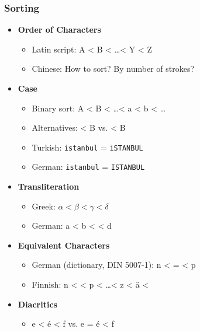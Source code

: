             \subsubsection{Sorting} %
                \begin{itemize}
                	\item \textbf{Order of Characters}
                		\begin{itemize}
                			\item Latin script: A < B < \dots < Y < Z
                			\item Chinese: How to sort? By number of strokes?
                		\end{itemize}
                	\item \textbf{Case}
                		\begin{itemize}
                			\item Binary sort: A < B < \dots < a < b < \dots
                			\item Alternatives:  < B vs.  < B
                			\item Turkish: \texttt{istanbul} = \texttt{iSTANBUL}
                			\item German: \texttt{istanbul} = \texttt{ISTANBUL}
                		\end{itemize}
                	\item \textbf{Transliteration}
                		\begin{itemize}
                			\item Greek: \( \alpha < \beta < \gamma < \delta \)
                			\item German: a < b <  < d
                		\end{itemize}
                	\item \textbf{Equivalent Characters}
                		\begin{itemize}
                			\item German (dictionary, DIN 5007-1): n <  =  < p
                			\item Finnish: n <  < p < \dots < z < ä < 
                		\end{itemize}
                	\item \textbf{Diacritics}
                		\begin{itemize}
                			\item e < {\'e} < f vs. e = {\'e} < f

\end{itemize}
\end{itemize}
